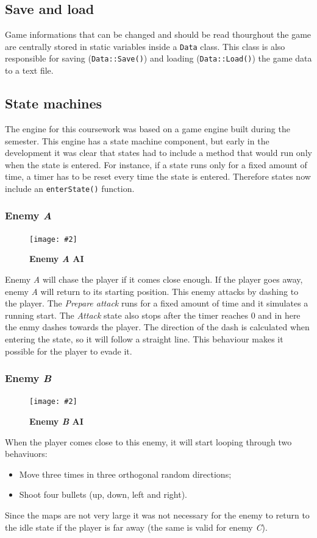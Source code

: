 \documentclass[10pt, a4paper]{article}
\newcommand{\figuremacro}[5]{
    \begin{figure}[#1]
        \centering
        \texttt{[image: \#2]}
        \caption[#3]{\textbf{#3}#4}
        \label{fig:#2}
    \end{figure}
}
\begin{document}
    \subsection{Save and load}
    Game informations that can be changed and should be read thourghout the game are centrally stored in static variables inside a \texttt{Data} class. This class is also responsible for saving (\texttt{Data::Save()}) and loading (\texttt{Data::Load()}) the game data to a text file.
    
    \subsection{State machines}
    The engine for this coursework was based on a game engine built during the semester. This engine has a state machine component, but early in the development it was clear that states had to include a method that would run only when the state is entered. For instance, if a state runs only for a fixed amount of time, a timer has to be reset every time the state is entered. Therefore states now include an \texttt{enterState()} function.
    
    \subsubsection{Enemy \textit{A}}
    \figuremacro{h}{EnemyA}{Enemy \textit{A} AI}{}{1.0}
    Enemy \textit{A} will chase the player if it comes close enough. If the player goes away, enemy \textit{A} will return to its starting position. This enemy attacks by dashing to the player. The \textit{Prepare attack} runs for a fixed amount of time and it simulates a running start. The \textit{Attack} state also stops after the timer reaches 0 and in here the enmy dashes towards the player. The direction of the dash is calculated when entering the state, so it will follow a straight line. This behaviour makes it possible for the player to evade it.
    
    \subsubsection{Enemy \textit{B}}
    \figuremacro{h}{EnemyB}{Enemy \textit{B} AI}{}{1.0}
    When the player comes close to this enemy, it will start looping through two behaviuors:
    \begin{itemize}
    	\item Move three times in three orthogonal random directions;
    	\item Shoot four bullets (up, down, left and right).
    \end{itemize}
	Since the maps are not very large it was not necessary for the enemy to return to the idle state if the player is far away (the same is valid for enemy \textit{C}).
    
\end{document}
